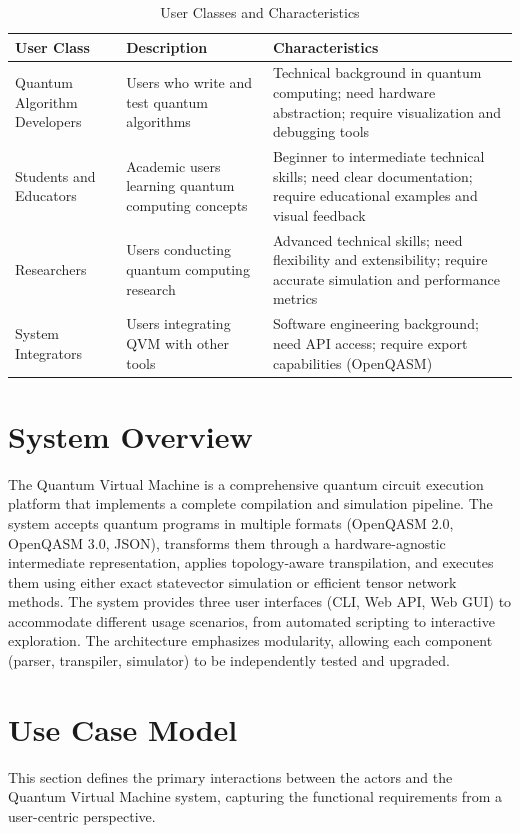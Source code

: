 \begin{table}[H]
\centering
\caption{User Classes and Characteristics}
\begin{tabular}{|p{3cm}|p{5cm}|p{5cm}|}
\hline
\textbf{User Class} & \textbf{Description} & \textbf{Characteristics} \\
\hline
Quantum Algorithm Developers & Users who write and test quantum algorithms & Technical background in quantum computing; need hardware abstraction; require visualization and debugging tools \\
\hline
Students and Educators & Academic users learning quantum computing concepts & Beginner to intermediate technical skills; need clear documentation; require educational examples and visual feedback \\
\hline
Researchers & Users conducting quantum computing research & Advanced technical skills; need flexibility and extensibility; require accurate simulation and performance metrics \\
\hline
System Integrators & Users integrating QVM with other tools & Software engineering background; need API access; require export capabilities (OpenQASM) \\
\hline
\end{tabular}
\end{table}

\section{System Overview}
The Quantum Virtual Machine is a comprehensive quantum circuit execution platform that implements a complete compilation and simulation pipeline. The system accepts quantum programs in multiple formats (OpenQASM 2.0, OpenQASM 3.0, JSON), transforms them through a hardware-agnostic intermediate representation, applies topology-aware transpilation, and executes them using either exact statevector simulation or efficient tensor network methods. The system provides three user interfaces (CLI, Web API, Web GUI) to accommodate different usage scenarios, from automated scripting to interactive exploration. The architecture emphasizes modularity, allowing each component (parser, transpiler, simulator) to be independently tested and upgraded.

\section{Use Case Model}
This section defines the primary interactions between the actors and the Quantum Virtual Machine system, capturing the functional requirements from a user-centric perspective.

